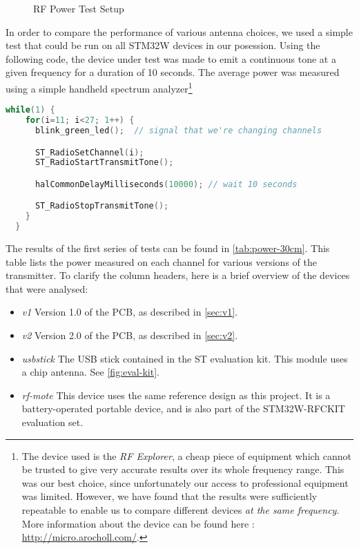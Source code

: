\begin{figure}[htb]
  \begin{center}
  \end{center}
  \caption{RF Power Test Setup}
  \label{fig:power-test-setup}
\end{figure}

In order to compare the performance of various antenna choices, we used a simple
test that could be run on all STM32W devices in our posession. Using the
following code, the device under test was made to emit a continuous tone at
a given frequency for a duration of 10 seconds. The average power was measured
using a simple handheld spectrum analyzer\footnote{The device used is the
\emph{RF Explorer}, a cheap piece of equipment which cannot be trusted to give
very accurate results over its whole frequency range. This was our best choice,
since unfortunately our access to professional equipment was limited. However,
we have found that the results were sufficiently repeatable to enable us to
compare different devices \emph{at the same frequency}. More information about
the device can be found here : \url{http://micro.arocholl.com/}.}

\begin{lstlisting}[language=C,caption=Tone generation code]
  while(1) {
    for(i=11; i<27; 1++) {
      blink_green_led();  // signal that we're changing channels

      ST_RadioSetChannel(i);
      ST_RadioStartTransmitTone();

      halCommonDelayMilliseconds(10000); // wait 10 seconds

      ST_RadioStopTransmitTone();
    }
  }
\end{lstlisting}

The results of the first series of tests can be found in
\autoref{tab:power-30cm}. This table lists the power measured on each channel
for various versions of the transmitter. To clarify the column headers, here is
a brief overview of the devices that were analysed:

\begin{itemize}
  \item \emph{v1} Version 1.0 of the PCB, as described in \autoref{sec:v1}.
  \item \emph{v2} Version 2.0 of the PCB, as described in \autoref{sec:v2}.
  \item \emph{usbstick} The USB stick contained in the ST evaluation kit. This
    module uses a chip antenna. See \autoref{fig:eval-kit}.
  \item \emph{rf-mote} This device uses the same reference design as this
    project. It is a battery-operated portable device, and is also part of the
    STM32W-RFCKIT evaluation set.
\end{itemize}

